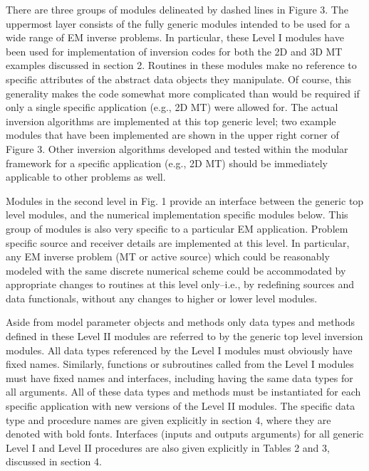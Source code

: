 There are three groups of modules delineated by dashed lines
in Figure 3.  The uppermost layer consists of
the fully generic modules intended to be used
for a wide range of EM inverse problems.  In particular, these Level I
modules have been used for implementation of inversion codes for
both the 2D and 3D MT examples discussed in section 2.
Routines in these modules make no
reference to specific attributes of the abstract data objects
they manipulate.  Of course, this generality makes the code somewhat more
complicated than would be required if only a single specific application
(e.g., 2D MT) were allowed for.  The actual inversion algorithms
are implemented at this top generic level; two example modules that have
been implemented are shown in the upper right corner of Figure 3.
Other inversion algorithms developed and tested within the modular
framework for a specific application (e.g., 2D MT) should 
be immediately applicable to other problems as well.

Modules in the second level in Fig. 1 provide an interface
between the generic top level modules, and the numerical
implementation specific modules below.  This group of
modules is also very specific to a particular EM
application.  Problem specific source and receiver
details are implemented at this level.  In particular,
any EM inverse problem (MT or active source)
which could be reasonably modeled with the same
discrete numerical scheme could be accommodated
by appropriate changes to routines at this level only--i.e.,
by redefining sources and data functionals, without any changes
to higher or lower level modules.

Aside from model parameter objects and methods
only data types and methods defined in these
Level II modules are referred to by the 
generic top level inversion modules.  All data types referenced
by the Level I modules must obviously have fixed names.
Similarly, functions or subroutines called
from the Level I modules must have fixed names and interfaces,
including having the same data types for all arguments.  All of these
data types and methods
must be instantiated for each specific application
with new versions of the Level II modules.  The specific data type
and procedure names are given explicitly in section 4, where
they are denoted with bold fonts.  Interfaces (inputs and outputs
arguments) for all generic Level I and Level II procedures
are also given explicitly in Tables 2 and 3,
discussed in section 4.

